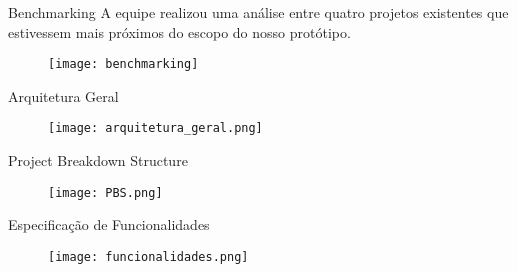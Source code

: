 \begin{frame}[t]{Benchmarking}
 A equipe realizou uma análise entre quatro projetos existentes que estivessem mais próximos do escopo do nosso protótipo.
    \begin{figure}
        \texttt{[image: benchmarking]}
    \end{figure}
    \vspace{1cm}

\end{frame}

\begin{frame}[t]{Arquitetura Geral}
    \begin{figure}
        \texttt{[image: arquitetura\_geral.png]}
    \end{figure}
\end{frame}

\begin{frame}[t]{Project Breakdown Structure}
    \vspace{0.5cm}
    \begin{figure}
        \texttt{[image: PBS.png]}
    \end{figure}
\end{frame}

\begin{frame}[t]{Especificação de Funcionalidades}
    \begin{figure}
        \texttt{[image: funcionalidades.png]}
    \end{figure}
\end{frame}

